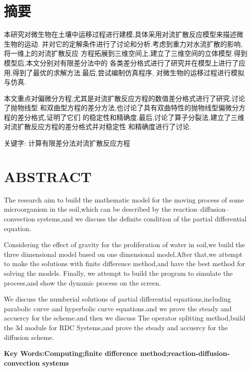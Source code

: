 
\chapter*{摘\qquad 要}
本研究对微生物在土壤中运移过程进行建模,具体采用对流扩散反应模型来描述微生物的运动.
并对它的定解条件进行了讨论和分析.考虑到重力对水流扩散的影响,将一维上的对流扩散反应
方程拓展到三维空间上,建立了三维空间的立体模型.得到模型后,本文分别对有限差分法中的
各类差分格式进行了研究并在模型上进行了应用,得到了最优的求解方法.最后,尝试编制仿真程序,
对微生物的运移过程进行模拟与仿真.\par
本文重点对偏微分方程,尤其是对流扩散反应方程的数值差分格式进行了研究.讨论了抛物线型
和双曲型方程的差分方法,也讨论了具有双曲特性的抛物线型偏微分方程的差分格式,证明了它们
的稳定性和精确度.最后,讨论了算子分裂法,建立了三维对流扩散反应方程的差分格式并对稳定性
和精确度进行了讨论.\par
\vspace*{\baselineskip}
{\heiti 关键字: 计算\quad 有限差分法\quad 对流扩散反应方程}
\clearpage{\pagestyle{empty}\cleardoublepage}
\chapter*{ABSTRACT}

The research aim to build the mathematic model for the moving process of
some microorganism in the soil,which can be described by the 
reaction--diffusion--convection systems,and we discuss the definite condition of 
the partial differential equation.\par Considering the effect of gravity for the  proliferation of water
in soil,we build the three dimensional model based on one dimensional model.After that,we attempt to
make the solutions with finite difference method,and have the best method for solving the models.
Finally, we attempt to build the program to simulate the process,and show the dynamic process on
the screen.\par
We discuss the numberial solutions of partial differential equations,including parabolic curve and
hyperbolic curve equations.and we prove the steady and accuercy for the scheme.and then we discuss
The operator splitting method,build the 3d module for RDC Systems,and prove the steady and accuercy 
for the diffusion scheme.\par
\vspace*{1.5em}
\noindent\textbf{Key Words:Computing;finite difference method;reaction-diffusion-convection systems}